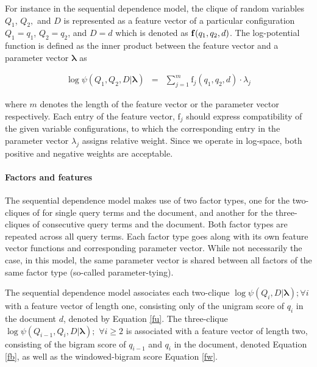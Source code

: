 \documentclass[]{article}
\begin{document}
For instance in the sequential dependence model, the clique of random
variables $Q_{1}$, $Q_{2},$ and $D$ is represented as a feature
vector of a particular configuration $Q_{1}=q_{1}$, $Q_{2}=q_{2}$,
and $D=d$ which is denoted as $\mbox{\ensuremath{\mathbf{f}}}(q_{1},q_{2},d)$.
The log-potential function is defined as the inner product between
the feature vector and a parameter vector $\boldsymbol{\lambda}$
as

\begin{eqnarray*}
\log\psi(Q_{1},Q_{2},D|\boldsymbol{\lambda}) & = & \sum_{j=1}^{m}\mbox{f}_{j}(q_{1},q_{2},d)\cdot\lambda_{j}
\end{eqnarray*}

where $m$ denotes the length of the feature vector
or the parameter vector respectively. Each entry of the feature vector,
$\mbox{f}_{j}$ should express compatibility of the given variable
configurations, to which the corresponding entry in the parameter
vector $\lambda_{j}$ assigns relative weight. Since we operate in
log-space, both positive and negative weights are acceptable.

\paragraph{Factors and features}

The sequential dependence model makes use of two factor types, one
for the two-cliques of for single query terms and the document, and
another for the three-cliques of consecutive query terms and the document.
Both factor types are repeated across all query terms. Each factor
type goes along with its own feature vector functions and corresponding
parameter vector. While not necessarily the case, in this model, the
same parameter vector is shared between all factors of the same factor
type (so-called parameter-tying).

The sequential dependence model associates each two-clique $\log\psi(Q_{i},D|\boldsymbol{\lambda});\forall i$
with a feature vector of length one, consisting only of the unigram
score of $q_{i}$ in the document $d$, denoted by Equation \ref{fu}.
The three-clique $\log\psi(Q_{i-1},Q_{i},D|\boldsymbol{\lambda});$
$\forall i\geq2$ is associated with a feature vector of length two,
consisting of the bigram score of $q_{i-1}$ and $q_{i}$ in the document,
denoted Equation \ref{fb}, as well as the windowed-bigram score Equation
\ref{fw}. 
\end{document}
